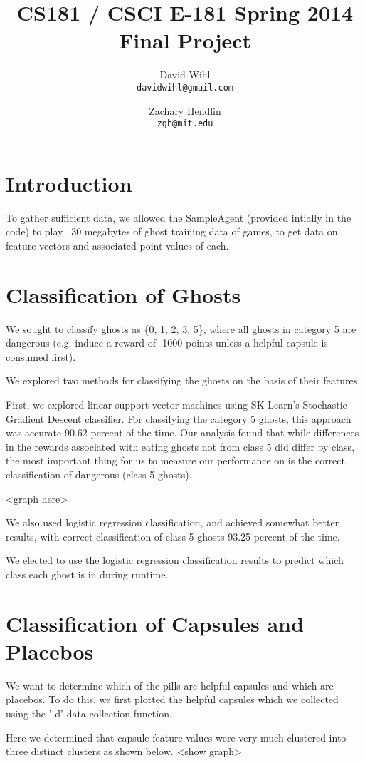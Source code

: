 \documentclass[11pt, oneside]{article}   	%
\title{CS181 / CSCI E-181 Spring 2014 Final Project}
\author{
  David Wihl\\
  \texttt{davidwihl@gmail.com}
  \and
  Zachary Hendlin\\
  \texttt{zgh@mit.edu} 
}
\begin{document}
\maketitle
\section*{Introduction}
To gather sufficient data, we allowed the SampleAgent (provided intially in the code) to play ~30 megabytes of ghost training data of games, to get data on feature vectors and associated point values of each.

\section*{Classification of Ghosts}
We sought to classify ghosts as \{0, 1, 2, 3, 5\}, where all ghosts in category 5 are dangerous (e.g. induce a reward of -1000 points unless a helpful capsule is consumed first).

We explored two methods for classifying the ghosts on the basis of their features.

First, we explored linear support vector machines using SK-Learn's Stochastic Gradient Descent classifier.
For classifying the category 5 ghosts, this approach was accurate 90.62 percent of the time. Our analysis found that while differences in the rewards associated with eating ghosts not from class 5 did differ by class, the most important thing for us to measure our performance on is the correct classification of dangerous (class 5 ghosts).

<graph here>

We also used logistic regression classification, and achieved somewhat better results, with correct classification of class 5 ghosts 93.25 percent of the time.

We elected to use the logistic regression classification results to predict which class each ghost is in during runtime.

\section*{Classification of Capsules and Placebos}
We want to determine which of the pills are helpful capsules and which are placebos. To do this, we first plotted the helpful capsules which we collected using the '-d' data collection function.

Here we determined that capsule feature values were very much clustered into three distinct clusters as shown below.
<show graph>
\end{document}
